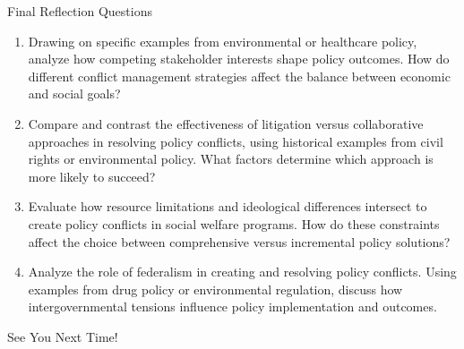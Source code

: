 \documentclass{beamer}  %
\begin{document}
\begin{frame}{Final Reflection Questions}

    \begin{enumerate}
    \item Drawing on specific examples from environmental or healthcare policy, analyze how competing stakeholder interests shape policy outcomes. How do different conflict management strategies affect the balance between economic and social goals?
    
    \bigskip
    
    \item Compare and contrast the effectiveness of litigation versus collaborative approaches in resolving policy conflicts, using historical examples from civil rights or environmental policy. What factors determine which approach is more likely to succeed?
    
    \bigskip 
    
    \item Evaluate how resource limitations and ideological differences intersect to create policy conflicts in social welfare programs. How do these constraints affect the choice between comprehensive versus incremental policy solutions?
    
    \bigskip
    
    \item Analyze the role of federalism in creating and resolving policy conflicts. Using examples from drug policy or environmental regulation, discuss how intergovernmental tensions influence policy implementation and outcomes.
    \end{enumerate}
    
    
    \end{frame}

\begin{frame}
    \begin{center}
        \Huge See You Next Time!
    \end{center}
\end{frame}
\end{document}
